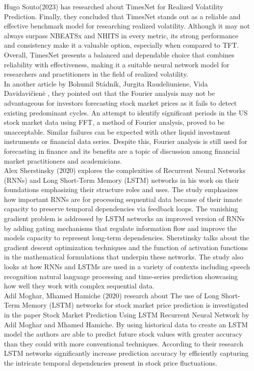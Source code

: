 \documentclass{ieeeojies}
\begin{document}
Hugo Souto(2023) \cite{b2} has researched about TimesNet for Realized Volatility Prediction. Finally, they concluded that TimesNet stands out as a reliable and effective benchmark model for researching realized volatility. Although it may not always surpass NBEATSx and NHITS in every metric, its strong performance and consistency make it a valuable option, especially when compared to TFT. Overall, TimesNet presents a balanced and dependable choice that combines reliability with effectiveness, making it a suitable neural network model for researchers and practitioners in the field of realized volatility. \\

In another article by Bohumil Stádník, Jurgita Raudeliuniene, Vida Davidavičienė \cite{b3}, they pointed out that the Fourier analysis may not be advantageous for investors forecasting stock market prices as it fails to detect existing predominant cycles. An attempt to identify significant periods in the US stock market data using FFT, a method of Fourier analysis, proved to be unacceptable. Similar failures can be expected with other liquid investment instruments or financial data series. Despite this, Fourier analysis is still used for forecasting in finance and its benefits are a topic of discussion among financial market practitioners and academicians.\\

Alex Sherstinsky (2020)\cite{b4}  explores the complexities of Recurrent Neural Networks (RNNs) and Long Short-Term Memory (LSTM) networks in his work on their foundations emphasizing their structure roles and uses. The study emphasizes how important RNNs are for processing sequential data because of their innate capacity to preserve temporal dependencies via feedback loops. The vanishing gradient problem is addressed by LSTM networks an improved version of RNNs by adding gating mechanisms that regulate information flow and improve the models capacity to represent long-term dependencies. Sherstinsky talks about the gradient descent optimization techniques and the function of activation functions in the mathematical formulations that underpin these networks. The study also looks at how RNNs and LSTMs are used in a variety of contexts including speech recognition natural language processing and time-series prediction showcasing how well they work with complex sequential data.\\

Adil Moghar, Mhamed Hamiche (2020)\cite{b5}  research about The use of Long Short-Term Memory (LSTM) networks for stock market price prediction is investigated in the paper Stock Market Prediction Using LSTM Recurrent Neural Network by Adil Moghar and Mhamed Hamiche. By using historical data to create an LSTM model the authors are able to predict future stock values with greater accuracy than they could with more conventional techniques. According to their research LSTM networks significantly increase prediction accuracy by efficiently capturing the intricate temporal dependencies present in stock price fluctuations.\\
\end{document}
